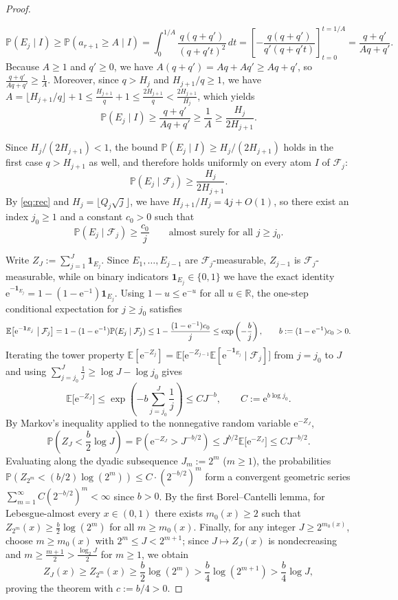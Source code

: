 \documentclass[11pt]{article}
\theoremstyle{definition}
\theoremstyle{remark}
\newcommand{\R}{\mathbb{R}}
\newcommand{\ee}{\mathrm{e}}
\begin{document}
\begin{proof}
\begin{itemize}[leftmargin=1.8em]
\[
\mathbb P(E_j\mid I)\ge\mathbb P(a_{r+1}\ge A\mid I)
=\int_0^{1/A}\frac{q(q+q')}{(q+q't)^2}\,dt
=\left[-\frac{q(q+q')}{q'(q+q't)}\right]_{t=0}^{t=1/A}
=\frac{q+q'}{Aq+q'}.
\]
Because $A\ge1$ and $q'\ge0$, we have $A(q+q')=Aq+Aq'\ge Aq+q'$, so
$\frac{q+q'}{Aq+q'}\ge\frac1A$. Moreover, since $q>H_j$ and $H_{j+1}/q\ge1$, we
have $A=\lfloor H_{j+1}/q\rfloor+1\le\frac{H_{j+1}}{q}+1\le\frac{2H_{j+1}}{q}<\frac{2H_{j+1}}{H_j}$,
which yields
\[
\mathbb P(E_j\mid I)\ge\frac{q+q'}{Aq+q'}\ge\frac1A\ge\frac{H_j}{2H_{j+1}}.
\]
\end{itemize}
Since $H_j/(2H_{j+1})<1$, the bound $\mathbb P(E_j\mid I)\ge H_j/(2H_{j+1})$
holds in the first case $q>H_{j+1}$ as well, and therefore holds uniformly on
every atom $I$ of $\mathcal F_j$:
\[
\mathbb P(E_j\mid\mathcal F_j)\ge\frac{H_j}{2H_{j+1}}.
\]
By \eqref{eq:rec} and $H_j=\lfloor Q_j\sqrt j\rfloor$, we have
$H_{j+1}/H_j=4j+O(1)$, so there exist an index $j_0\ge1$ and a constant
$c_0>0$ such that
\[
\mathbb P(E_j\mid\mathcal F_j)\ge\frac{c_0}{j}\qquad\text{almost surely for all }j\ge j_0.
\]

Write $Z_J:=\sum_{j=1}^J\mathbf 1_{E_j}$. Since $E_1,\dots,E_{j-1}$ are
$\mathcal F_j$-measurable, $Z_{j-1}$ is $\mathcal F_j$-measurable, while on binary
indicators $\mathbf 1_{E_j}\in\{0,1\}$ we have the exact identity
$\ee^{-\mathbf 1_{E_j}}=1-(1-\ee^{-1})\mathbf 1_{E_j}$. Using $1-u\le\ee^{-u}$
for all $u\in\R$, the one-step conditional expectation for $j\ge j_0$ satisfies
\[
\mathbb E\bigl[\ee^{-\mathbf 1_{E_j}}\bigm|\mathcal F_j\bigr]
=1-(1-\ee^{-1})\mathbb P(E_j\mid\mathcal F_j)
\le 1-\frac{(1-\ee^{-1})c_0}{j}
\le\exp\left(-\frac{b}{j}\right),\qquad b:=(1-\ee^{-1})c_0>0.
\]
Iterating the tower property $\mathbb E[\ee^{-Z_j}]=\mathbb E\bigl[\ee^{-Z_{j-1}}\mathbb E[\ee^{-\mathbf 1_{E_j}}\mid\mathcal F_j]\bigr]$
from $j=j_0$ to $J$ and using $\sum_{j=j_0}^J\frac1j\ge\log J-\log j_0$ gives
\[
\mathbb E\bigl[\ee^{-Z_J}\bigr]
\le\exp\left(-b\sum_{j=j_0}^J\frac1j\right)
\le C J^{-b},\qquad C:=\ee^{b\log j_0}.
\]
By Markov's inequality applied to the nonnegative random variable $\ee^{-Z_J}$,
\[
\mathbb P\left(Z_J<\frac{b}{2}\log J\right)
=\mathbb P\left(\ee^{-Z_J}>J^{-b/2}\right)
\le J^{b/2}\mathbb E\bigl[\ee^{-Z_J}\bigr]
\le C J^{-b/2}.
\]
Evaluating along the dyadic subsequence $J_m:=2^m$ ($m\ge1$), the probabilities
$\mathbb P(Z_{2^m}<(b/2)\log(2^m))\le C\cdot(2^{-b/2})^m$ form a convergent
geometric series $\sum_{m=1}^\infty C(2^{-b/2})^m<\infty$ since $b>0$. By the
first Borel--Cantelli lemma, for Lebesgue-almost every $x\in(0,1)$ there exists
$m_0(x)\ge2$ such that $Z_{2^m}(x)\ge\frac{b}{2}\log(2^m)$ for all
$m\ge m_0(x)$. Finally, for any integer $J\ge 2^{m_0(x)}$, choose $m\ge m_0(x)$
with $2^m\le J<2^{m+1}$; since $J\mapsto Z_J(x)$ is nondecreasing and
$m\ge\frac{m+1}{2}>\frac{\log_2 J}{2}$ for $m\ge1$, we obtain
\[
Z_J(x)\ge Z_{2^m}(x)\ge\frac{b}{2}\log(2^m)>\frac{b}{4}\log(2^{m+1})>\frac{b}{4}\log J,
\]
proving the theorem with $c:=b/4>0$.
\end{proof}
\end{document}
